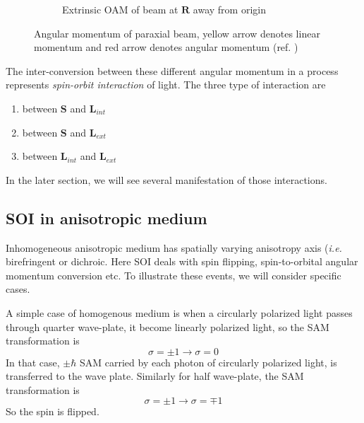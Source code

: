 \documentclass[11pt,a4paper]{article}
\numberwithin{equation}{section}
\begin{document}
\begin{figure}[H]
\begin{subfigure}[H]{0.31\textwidth}
		\caption{Extrinsic OAM of beam at $\boldsymbol{R}$ away from origin}
		\label{fig:eoam}
	\end{subfigure}
	\caption{Angular momentum of paraxial beam, yellow arrow denotes linear momentum and red arrow denotes angular momentum (ref. \cite{bliokh 15})}
	\label{fig:am}
\end{figure}

The inter-conversion between these different angular momentum in a process represents \textit{spin-orbit interaction} of light. \cite{bliokh 15} The three type of interaction  are
\begin{enumerate}
	\item between $\boldsymbol{S}$ and $\boldsymbol{L}_{int}$
	\item between $\boldsymbol{S}$ and $\boldsymbol{L}_{ext}$
	\item between $\boldsymbol{L}_{int}$ and $\boldsymbol{L}_{ext}$
\end{enumerate}
In the later section, we will see several manifestation of those interactions.


\subsection{SOI in anisotropic medium}
Inhomogeneous anisotropic medium has spatially varying anisotropy axis (\textit{i.e.} birefringent or dichroic. Here SOI deals with spin flipping, spin-to-orbital angular momentum conversion etc. To illustrate these events, we will consider specific cases.

A simple case of homogenous medium is when a circularly polarized light passes through quarter wave-plate, it become linearly polarized light, so the SAM transformation is $$\sigma=\pm1 \longrightarrow \sigma= 0$$ 
In that case, $\pm\hbar$ SAM carried by each photon of circularly polarized light, is transferred to the wave plate. Similarly for half wave-plate, the SAM transformation is 
$$\sigma=\pm 1 \longrightarrow \sigma=\mp1$$ So the spin is flipped.
\end{document}
